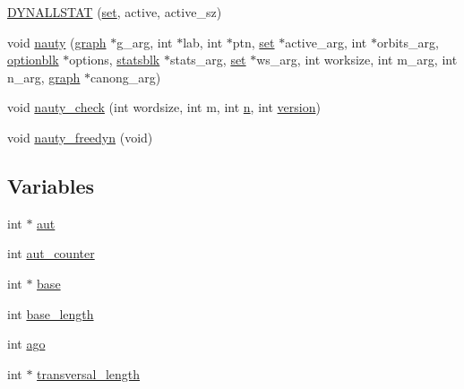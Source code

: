 \begin{DoxyCompactItemize}
\item 
\mbox{\hyperlink{_l_i_b_2_g_a_l_o_i_s_2nauty_8_c_a01c47f62475fcbac5d55035f42789f8b}{D\+Y\+N\+A\+L\+L\+S\+T\+AT}} (\mbox{\hyperlink{nauty_8h_a9690bea211101f22a5e154087590c3da}{set}}, active, active\+\_\+sz)
\item 
void \mbox{\hyperlink{_l_i_b_2_g_a_l_o_i_s_2nauty_8_c_a3b517715a2dcc1c4a5b5f9d20ff67645}{nauty}} (\mbox{\hyperlink{nauty_8h_a28c08db7c5948ab173e0f0497773f2f1}{graph}} $\ast$g\+\_\+arg, int $\ast$lab, int $\ast$ptn, \mbox{\hyperlink{nauty_8h_a9690bea211101f22a5e154087590c3da}{set}} $\ast$active\+\_\+arg, int $\ast$orbits\+\_\+arg, \mbox{\hyperlink{structoptionblk}{optionblk}} $\ast$options, \mbox{\hyperlink{structstatsblk}{statsblk}} $\ast$stats\+\_\+arg, \mbox{\hyperlink{nauty_8h_a9690bea211101f22a5e154087590c3da}{set}} $\ast$ws\+\_\+arg, int worksize, int m\+\_\+arg, int n\+\_\+arg, \mbox{\hyperlink{nauty_8h_a28c08db7c5948ab173e0f0497773f2f1}{graph}} $\ast$canong\+\_\+arg)
\item 
void \mbox{\hyperlink{_l_i_b_2_g_a_l_o_i_s_2nauty_8_c_a419220950218f031551b5efb3b8b0c36}{nauty\+\_\+check}} (int wordsize, int m, int \mbox{\hyperlink{simeon_8_c_a7f2cd26777ce0ff3fdaf8d02aacbddfb}{n}}, int \mbox{\hyperlink{tdo__start_8_c_a0f1d0e4d3d22d72be50dfaa5f7f59b72}{version}})
\item 
void \mbox{\hyperlink{_l_i_b_2_g_a_l_o_i_s_2nauty_8_c_a4a20dd42bb3bcee28744de3e998658ab}{nauty\+\_\+freedyn}} (void)
\end{DoxyCompactItemize}
\subsection*{Variables}
\begin{DoxyCompactItemize}
\item 
int $\ast$ \mbox{\hyperlink{_l_i_b_2_g_a_l_o_i_s_2nauty_8_c_abf9a952417da114f625163271f78ba7b}{aut}}
\item 
int \mbox{\hyperlink{_l_i_b_2_g_a_l_o_i_s_2nauty_8_c_aa94cc158ac755d28ac2759ef6a234f37}{aut\+\_\+counter}}
\item 
int $\ast$ \mbox{\hyperlink{_l_i_b_2_g_a_l_o_i_s_2nauty_8_c_a4015213f1363674b898680b20e217b4e}{base}}
\item 
int \mbox{\hyperlink{_l_i_b_2_g_a_l_o_i_s_2nauty_8_c_ad891775c193444b219f8fd440f77de4b}{base\+\_\+length}}
\item 
int \mbox{\hyperlink{_l_i_b_2_g_a_l_o_i_s_2nauty_8_c_a8d80b254be0a99465af6ccfde50dbfcc}{ago}}
\item 
int $\ast$ \mbox{\hyperlink{_l_i_b_2_g_a_l_o_i_s_2nauty_8_c_a5bf01bb16be28d88eadec2175676737a}{transversal\+\_\+length}}
\end{DoxyCompactItemize}


